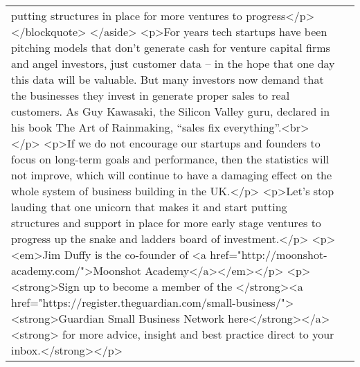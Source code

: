 \documentclass[]{article}
\begin{document}
\begin{table}[!h]
{\begin{tabular}[t]{ll}
putting structures in place for more ventures to progress</p> </blockquote> </aside>  <p>For years tech startups have been pitching models that don’t generate cash for venture capital firms and angel investors, just customer data – in the hope that one day this data will be valuable. But many investors now demand that the businesses they invest in generate proper sales to real customers. As Guy Kawasaki, the Silicon Valley guru, declared in his book The Art of Rainmaking, “sales fix everything”.<br></p> <p>If we do not encourage our startups and founders to focus on long-term goals and performance, then the statistics will not improve, which will continue to have a damaging effect on the whole system of business building in the UK.</p> <p>Let’s stop lauding that one unicorn that makes it and start putting structures and support in place for more early stage ventures to progress up the snake and ladders board of investment.</p> <p><em>Jim Duffy is the co-founder of <a href="http://moonshot-academy.com/">Moonshot Academy</a></em></p> <p><strong>Sign up to become a member of the </strong><a href="https://register.theguardian.com/small-business/"><strong>Guardian Small Business Network here</strong></a><strong> for more advice, insight and best practice direct to your inbox.</strong></p>\\

\end{tabular}}
\end{table}
\end{document}
